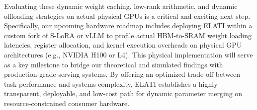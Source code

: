 Evaluating these dynamic weight caching, low-rank arithmetic, and dynamic offloading strategies on actual physical GPUs is a critical and exciting next step. Specifically, our upcoming hardware roadmap includes deploying ELATI within a custom fork of S-LoRA or vLLM to profile actual HBM-to-SRAM weight loading latencies, register allocation, and kernel execution overheads on physical GPU architectures (e.g., NVIDIA H100 or L4). This physical implementation will serve as a key milestone to bridge our theoretical and simulated findings with production-grade serving systems.
By offering an optimized trade-off between task performance and systems complexity, ELATI establishes a highly transparent, deployable, and low-cost path for dynamic parameter merging on resource-constrained consumer hardware.
